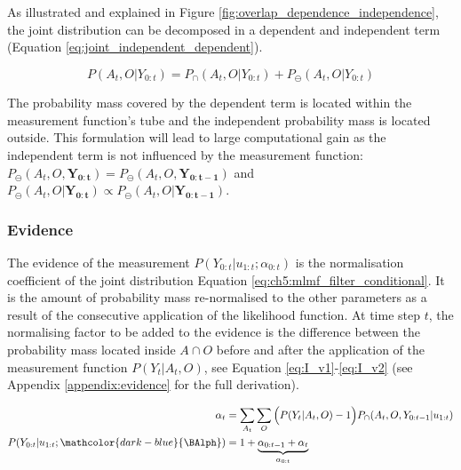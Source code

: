 As illustrated and explained in Figure \ref{fig:overlap_dependence_independence}, the joint distribution can be decomposed in a 
dependent and independent term (Equation \ref{eq:joint_independent_dependent}). 

\begin{equation}\label{eq:joint_independent_dependent}
 P(A_t,O|Y_{0:t}) = P_{\cap}(A_t,O|Y_{0:t}) + P_{\ominus}(A_t,O|Y_{0:t})
\end{equation}

The probability mass covered by the dependent term is located within the measurement function's tube and the independent probability mass 
is located outside. This formulation will lead to large computational gain 
as the independent term is not influenced by the measurement function: 
$P_{\ominus}(A_t,O,\mathbf{Y_{0:t}}) = P_{\ominus}(A_t,O,\mathbf{Y_{0:t-1}})$ and 
$P_{\ominus}(A_t,O|\mathbf{Y_{0:t}}) \propto P_{\ominus}(A_t,O|\mathbf{Y_{0:t-1}})$.

\subsubsection{Evidence}
The evidence of the measurement $P(Y_{0:t}|u_{1:t};\alpha_{0:t})$ is the normalisation coefficient of the joint distribution Equation \ref{eq:ch5:mlmf_filter_conditional}.
It is the amount of probability mass re-normalised to the other parameters as a result of the consecutive application of the likelihood function.
At time step $t$, the normalising factor to be added to the evidence is the difference between the probability mass located 
inside $A\cap O$ before and after the application of the measurement function $P(Y_t|A_t,O)$, 
see Equation \ref{eq:I_v1}-\ref{eq:I_v2} (see Appendix \ref{appendix:evidence} for the full derivation).

\begin{align}
 \alpha_t 			 	&= \sum\limits_{A_t}\sum\limits_{O} \Big(P(Y_t|A_t,O) - 1\Big)P_{\cap}(A_t,O,Y_{0:t-1}|u_{1:t}) \label{eq:I_v1} \\
 P(Y_{0:t}|u_{1:t};\mathcolor{dark-blue}{\BAlph})        &= 1 + \underbrace{\alpha_{0:t-1} + \alpha_t}_{\alpha_{0:t}} \label{eq:I_v2}
\end{align}

